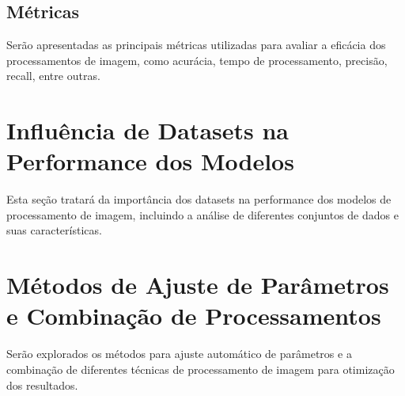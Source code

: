 \subsection{Métricas}
Serão apresentadas as principais métricas utilizadas para avaliar a eficácia dos processamentos de imagem, como acurácia, tempo de processamento, precisão, recall, entre outras.

\section{Influência de Datasets na Performance dos Modelos}
Esta seção tratará da importância dos datasets na performance dos modelos de processamento de imagem, incluindo a análise de diferentes conjuntos de dados e suas características.

\section{Métodos de Ajuste de Parâmetros e Combinação de Processamentos}
Serão explorados os métodos para ajuste automático de parâmetros e a combinação de diferentes técnicas de processamento de imagem para otimização dos resultados.
